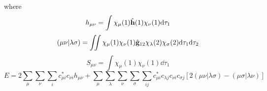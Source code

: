 \documentclass[UTF8]{ctexart} %
\numberwithin{equation}{section}
\begin{document}
where
\begin{equation}\label{key}
h_{\mu\nu}=\int\chi_\mu(1)\hat{\vb{h}}(1)\chi_\nu(1)\dd \tau_1
\end{equation}
\begin{equation}\label{key}
(\mu\nu|\lambda\sigma)=\iint\chi_\mu(1)\chi_\nu(1)\hat{\vb{g}}_{12}\chi_\lambda(2)\chi_\sigma(2)\dd\tau_1\dd\tau_2
\end{equation}
\begin{equation}\label{key}
S_{\mu\nu}=\int\chi_\mu(1)\chi_\nu(1)\dd\tau_1
\end{equation}
\begin{equation}\label{key}
E=2\sum_\mu\sum_\nu\sum_i c_{\mu i}^* c_{\nu i}h_{\mu\nu}+\sum_\mu\sum_\lambda\sum_\nu\sum_\sigma\sum_{ij} c_{\mu i}^*c_{\lambda j} c_{\nu i}c_{\sigma j} [2(\mu\nu|\lambda\sigma)-(\mu\sigma|\lambda\nu)]
\end{equation}
\end{document}
